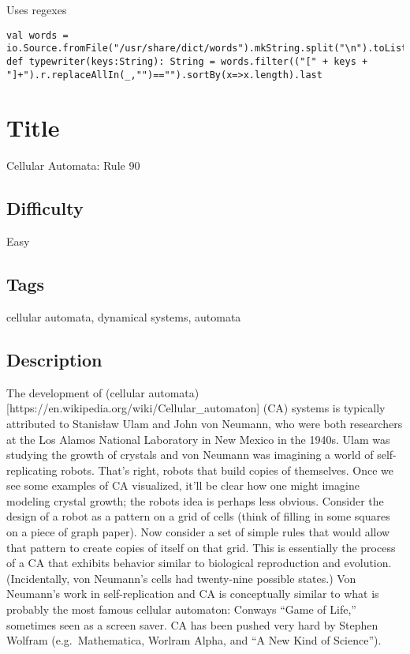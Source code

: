 Uses regexes

\begin{verbatim}
val words = io.Source.fromFile("/usr/share/dict/words").mkString.split("\n").toList
def typewriter(keys:String): String = words.filter(("[" + keys + "]+").r.replaceAllIn(_,"")=="").sortBy(x=>x.length).last
\end{verbatim}

\section{Title}\label{title-3}

Cellular Automata: Rule 90

\subsection{Difficulty}\label{difficulty-3}

Easy

\subsection{Tags}\label{tags-3}

cellular automata, dynamical systems, automata

\subsection{Description}\label{description-3}

The development of (cellular
automata){[}https://en.wikipedia.org/wiki/Cellular\_automaton{]} (CA)
systems is typically attributed to Stanisław Ulam and John von Neumann,
who were both researchers at the Los Alamos National Laboratory in New
Mexico in the 1940s. Ulam was studying the growth of crystals and von
Neumann was imagining a world of self-replicating robots. That's right,
robots that build copies of themselves. Once we see some examples of CA
visualized, it'll be clear how one might imagine modeling crystal
growth; the robots idea is perhaps less obvious. Consider the design of
a robot as a pattern on a grid of cells (think of filling in some
squares on a piece of graph paper). Now consider a set of simple rules
that would allow that pattern to create copies of itself on that grid.
This is essentially the process of a CA that exhibits behavior similar
to biological reproduction and evolution. (Incidentally, von Neumann's
cells had twenty-nine possible states.) Von Neumann's work in
self-replication and CA is conceptually similar to what is probably the
most famous cellular automaton: Conways ``Game of Life,'' sometimes seen
as a screen saver. CA has been pushed very hard by Stephen Wolfram
(e.g.~Mathematica, Worlram Alpha, and ``A New Kind of Science'').

